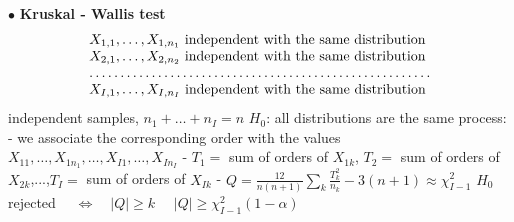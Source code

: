 \documentclass[twoside]{book}
\begin{document}
\pagestyle{empty}

\def\dr #1{\par\noindent $\bullet$ {\bf #1}}

\dr{Kruskal - Wallis test} 
\begin{multline*}\begin{matrix}
X_{1,1},\dots,X_{1,n_1} \text{ independent with the same distribution } \\
X_{2,1},\dots,X_{2,n_2} \text{  independent with the same distribution  } \\
\hdotsfor{1}  \\
X_{I,1},\dots,X_{I,n_{I}} \text{  independent with the same distribution  }
\end{matrix}  \end{multline*}
\hspace*{80mm} independent samples, $n_1+\dots+n_{I}=n$
\newline $H_0$:  all distributions are the same
\newline
process:
\newline - we associate the corresponding order with the values $X_{11},\dots, X_{1n_1}, \dots, X_{I1},\dots, X_{In_I} $ 
\newline - $T_1=$ sum of orders of $X_{1k}$, $T_2=$ sum of orders of  $X_{2k}$,...,$T_I=$ sum of orders of  $X_{Ik}$
\newline - $\displaystyle{ Q=\frac{12}{n(n+1)} \sum_k \frac{T^2_k}{n_k} -3(n+1)\approx \chi^2_{I-1}}$
\newline $H_0$  rejected $\quad \Longleftrightarrow\quad |Q| \geq k$
\newline \phantom{$H_0$  rejected $\quad \Longleftrightarrow$} $\quad |Q| \geq \chi^2_{I-1}(1-\alpha)$
\end{document}
